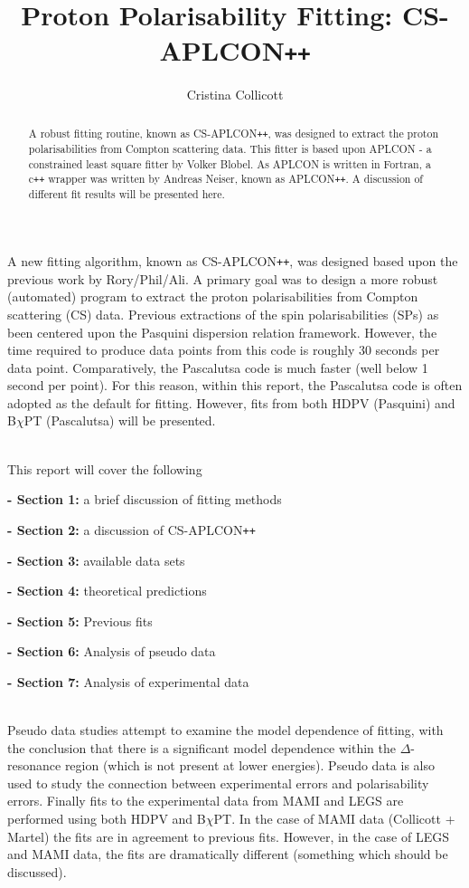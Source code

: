 \documentclass[]{article}
\title{Proton Polarisability Fitting: CS-APLCON\texttt{++} }
\author{Cristina Collicott}
\begin{document}
	
\maketitle

\begin{abstract}
	A robust fitting routine, known as CS-APLCON\texttt{++}, was designed to extract the proton polarisabilities from Compton scattering data. This fitter is based upon APLCON - a constrained least square fitter by Volker Blobel. As APLCON is written in Fortran, a c\texttt{++} wrapper was written by Andreas Neiser, known as APLCON\texttt{++}. A discussion of different fit results will be presented here. \vspace{3mm}
\end{abstract}

\noindent A new fitting algorithm, known as CS-APLCON\texttt{++}, was designed based upon the previous work by Rory/Phil/Ali. A primary goal was to design a more robust (automated) program to extract the proton polarisabilities from Compton scattering (CS) data. Previous extractions of the spin polarisabilities (SPs) as been centered upon the Pasquini dispersion relation framework. However, the time required to produce data points from this code is roughly 30 seconds per data point. Comparatively, the Pascalutsa code is much faster (well below 1 second per point). For this reason, within this report, the Pascalutsa code is often adopted as the default for fitting. However, fits from both HDPV (Pasquini) and B$\chi$PT (Pascalutsa) will be presented.

\noindent \\This report will cover the following

\textbf{- Section 1:} a brief discussion of fitting methods

\textbf{- Section 2:} a discussion of CS-APLCON\texttt{++}

\textbf{- Section 3:} available data sets

\textbf{- Section 4:} theoretical predictions

\textbf{- Section 5:} Previous fits

\textbf{- Section 6:} Analysis of pseudo data

\textbf{- Section 7:} Analysis of experimental data


\noindent \\ Pseudo data studies attempt to examine the model dependence of fitting, with the conclusion that there is a significant model dependence within the $\Delta$-resonance region (which is not present at lower energies). Pseudo data is also used to study the connection between experimental errors and polarisability errors. Finally fits to the experimental data from MAMI and LEGS are performed using both HDPV and B$\chi$PT. In the case of MAMI data (Collicott + Martel) the fits are in agreement to previous fits. However, in the case of LEGS and MAMI data, the fits are dramatically different (something which should be discussed).
\end{document}
